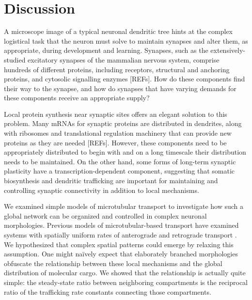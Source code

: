 \documentclass[fleqn,10pt]{wlpeerj}
\begin{document}
\section*{Discussion}

A microscope image of a typical neuronal dendritic tree hints at the complex logistical task that the neuron must solve to maintain synapses and alter them, as appropriate, during development and learning. Synapses, such as the extensively-studied excitatory synapses of the mammalian nervous system, comprise hundreds of different proteins, including receptors, structural and anchoring proteins, and cytosolic signalling enzymes [REFs]. How do these components find their way to the synapse, and how do synapses that have varying demands for these components receive an appropriate supply?

Local protein synthesis near synaptic sites offers an elegant solution to this problem. Many mRNAs for synaptic proteins are distributed in dendrites, along with ribosomes and translational regulation machinery that can provide new proteins as they are needed [REFs]. However, these components need to be appropriately distributed to begin with and on a long timescale their distribution needs to be maintained. On the other hand, some forms of long-term synaptic plasticity have a transcription-dependent component, suggesting that somatic biosynthesis and dendritic trafficking are important for maintaining and controlling synaptic connectivity in addition to local mechanisms.

We examined simple models of microtubular transport to investigate how such a global network can be organized and controlled in complex neuronal morphologies. Previous models of microtubular-based transport have examined systems with spatially uniform rates of anterograde and retrograde transport \citep{Smith_2001,Bressloff_2006}. We hypothesized that complex spatial patterns could emerge by relaxing this assumption. One might na\"ively expect that elaborately branched morphologies obfuscate the relationship between these local mechanisms and the global distribution of molecular cargo. We showed that the relationship is actually quite simple: the steady-state ratio between neighboring compartments is the reciprocal ratio of the trafficking rate constants connecting those compartments.
\end{document}
